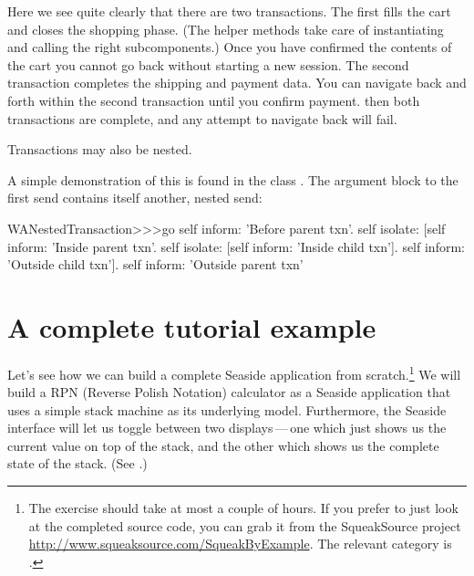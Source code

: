 \documentclass[a4paper,10pt,twoside]{book}
\begin{document}
Here we see quite clearly that there are two transactions.
The first fills the cart and closes the shopping phase.
(The helper methods  \etc take care of instantiating and calling the right subcomponents.)
Once you have confirmed the contents of the cart you cannot go back without starting a new session.
The second transaction completes the shipping and payment data.
You can navigate back and forth within the second transaction until you confirm payment.
then both transactions are complete, and any attempt to navigate back will fail.

Transactions may also be nested.

A simple demonstration of this is found in the class .
The argument block to the first  send contains itself another, nested  send:

\begin{code}{}
WANestedTransaction>>>go
	self inform: 'Before parent txn'.
	self isolate:
			[self inform: 'Inside parent txn'.
			self isolate: [self inform: 'Inside child txn'].
			self inform: 'Outside child txn'].
	self inform: 'Outside parent txn'
\end{code}


\section{A complete tutorial example}


Let's see how we can build a complete Seaside application from scratch.\footnote{The exercise should take at most a couple of hours. If you prefer to just look at the completed source code, you can grab it from the SqueakSource project \url{http://www.squeaksource.com/SqueakByExample}.
The relevant category is .}
We will build a RPN (Reverse Polish Notation) calculator as a Seaside application that uses a simple stack machine as its underlying model.
Furthermore, the Seaside interface will let us toggle between two displays\,---\,one which just shows us the current value on top of the stack, and the other which shows us the complete state of the stack.
(See .)
\end{document}
